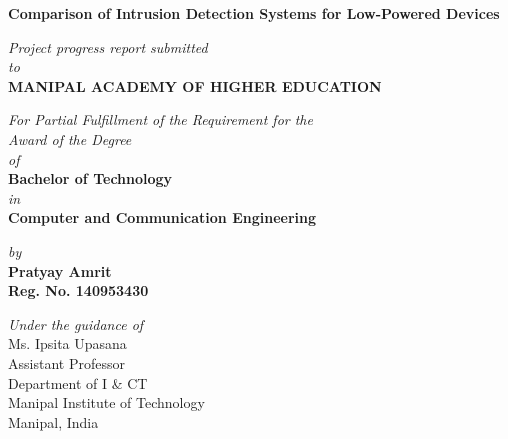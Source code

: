 \documentclass[a4paper,12pt]{article}
\begin{document}
	\begin{titlepage}

		\vspace*{2cm}
		\begin{center}
            \large{\textbf{Comparison of Intrusion Detection Systems for Low-Powered Devices}}
		\end{center}
		\vspace{0.5cm}
		\begin{center}
            \small{\textit{Project progress report submitted} \\ \vspace{0.25cm} \textit{to} \\ \vspace{0.25cm}\textbf{MANIPAL ACADEMY OF HIGHER EDUCATION} \\}
		\end{center}
		\vspace{0.25cm}
		\begin{center}
		\small{\textit{For Partial Fulfillment of the Requirement for the\\ \vspace{0.25cm}Award of the Degree\\ \vspace{0.25cm}of}} \\ \vspace{0.25cm}
		\textbf{Bachelor of Technology} \\  \vspace{0.25cm} \textit{in} \\ \textbf{Computer and Communication Engineering}
		\end{center}
		\begin{center}
		\small{\textit{by}} \\
		\textbf{Pratyay Amrit} \\ \textbf{Reg. No. 140953430} \\
		\end{center}

		\begin{center}
		\small{\textit{Under the guidance of}} \\
		\renewcommand{\baselinestretch}{1}
		\vspace{0.5cm}
		Ms. Ipsita Upasana \\
		Assistant Professor \\
		Department of I \& CT \\
		 Manipal Institute of Technology \\
		Manipal, India
		\end{center}


\end{titlepage}
\end{document}
